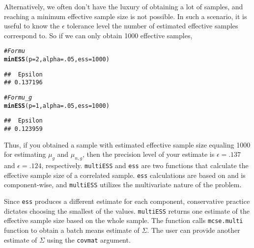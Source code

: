 \documentclass[11pt]{article}\usepackage[]{graphicx}\usepackage[]{color}
\makeatletter
\newcommand{\hlnum}[1]{\textcolor[rgb]{0.686,0.059,0.569}{#1}}%
\newcommand{\hlcom}[1]{\textcolor[rgb]{0.678,0.584,0.686}{\textit{#1}}}%
\newcommand{\hlstd}[1]{\textcolor[rgb]{0.345,0.345,0.345}{#1}}%
\newcommand{\hlkwc}[1]{\textcolor[rgb]{0.333,0.667,0.333}{#1}}%
\newcommand{\hlkwd}[1]{\textcolor[rgb]{0.737,0.353,0.396}{\textbf{#1}}}%
\newenvironment{kframe}{%
 \def\at@end@of@kframe{}%
 \ifinner\ifhmode%
  \def\at@end@of@kframe{\end{minipage}}%
  \begin{minipage}{\columnwidth}%
 \fi\fi%
 \def\FrameCommand##1{\hskip\@totalleftmargin \hskip-\fboxsep
 \colorbox{shadecolor}{##1}\hskip-\fboxsep
     \hskip-\linewidth \hskip-\@totalleftmargin \hskip\columnwidth}%
 \MakeFramed {\advance\hsize-\width
   \@totalleftmargin\z@ \linewidth\hsize
   \@setminipage}}%
 {\par\unskip\endMakeFramed%
 \at@end@of@kframe}
\newenvironment{knitrout}{}{} %
\makeatother
\begin{document}
Alternatively, we often don't have the luxury of obtaining a lot of samples, and reaching a minimum effective sample size is not possible. In such a scenario, it is useful to know the $\epsilon$ tolerance level the number of estimated effective samples correspond to. So if we can only obtain 1000 effective samples,
\begin{knitrout}
\color{fgcolor}\begin{kframe}
\begin{alltt}
\hlcom{# For mu}
\hlkwd{minESS}\hlstd{(}\hlkwc{p} \hlstd{=} \hlnum{2}\hlstd{,} \hlkwc{alpha} \hlstd{=} \hlnum{.05}\hlstd{,} \hlkwc{ess} \hlstd{=} \hlnum{1000}\hlstd{)}
\end{alltt}
\begin{verbatim}
##  Epsilon 
## 0.137196
\end{verbatim}
\begin{alltt}
\hlcom{#For mu_g}
\hlkwd{minESS}\hlstd{(}\hlkwc{p} \hlstd{=} \hlnum{1}\hlstd{,} \hlkwc{alpha} \hlstd{=} \hlnum{.05}\hlstd{,} \hlkwc{ess} \hlstd{=} \hlnum{1000}\hlstd{)}
\end{alltt}
\begin{verbatim}
##  Epsilon 
## 0.123959
\end{verbatim}
\end{kframe}
\end{knitrout}

Thus, if you obtained a sample with estimated effective sample size equaling 1000 for estimating $\mu_g$ and $\mu_{n,g}$, then the precision level of your estimate is $\epsilon = .137$ and $\epsilon = .124$, respectively.
\texttt{multiESS} and \texttt{ess} are two functions that calculate the effective sample size of a correlated sample. \texttt{ess} calculations are based on \cite{gong2015practical} and is component-wise, and \texttt{multiESS} utilizes the multivariate nature of the problem.


Since \texttt{ess} produces a different estimate for each component, conservative practice dictates choosing the smallest of the values. \texttt{multiESS} returns one estimate of the effective sample size based on the whole sample. The function calls \texttt{mcse.multi} function to obtain a batch means estimate of $\Sigma$. The user can provide another estimate of $\Sigma$ using the \texttt{covmat} argument.
\end{document}
